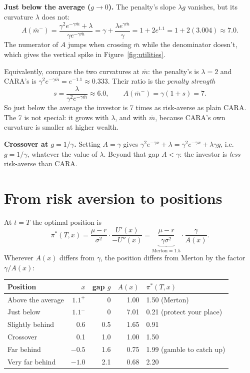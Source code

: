 \documentclass[11pt]{article}
\newcommand{\mb}{\bar m}
\begin{document}
\textbf{Just below the average ($g\to0$).} The penalty's slope $\lambda g$ vanishes, but its
curvature $\lambda$ does not:
\[
  A(\mb^-) = \frac{\gamma^2e^{-\gamma\mb}+\lambda}{\gamma e^{-\gamma\mb}}
           = \gamma + \frac{\lambda e^{\gamma\mb}}{\gamma}
           = 1 + 2e^{1.1} = 1 + 2(3.004) \approx 7.0 .
\]
The numerator of $A$ jumps when crossing $\mb$ while the denominator doesn't, which gives
the vertical spike in Figure~\ref{fig:utilities}.

Equivalently, compare the two curvatures at $\mb$: the penalty's is $\lambda=2$ and CARA's
is $\gamma^2e^{-\gamma\mb}=e^{-1.1}\approx0.333$. Their ratio is the
\emph{penalty strength}
\[
  s = \frac{\lambda}{\gamma^2e^{-\gamma\mb}} \approx 6.0,
  \qquad A(\mb^-) = \gamma(1+s) = 7 .
\]
So just below the average the investor is 7 times as risk-averse as plain CARA. The 7 is
not special: it grows with $\lambda$, and with $\mb$, because CARA's own curvature is
smaller at higher wealth.

\textbf{Crossover at $g=1/\gamma$.} Setting $A=\gamma$ gives
$\gamma^2e^{-\gamma x}+\lambda=\gamma^2e^{-\gamma x}+\lambda\gamma g$, i.e.\ $g=1/\gamma$,
whatever the value of $\lambda$. Beyond that gap $A<\gamma$: the investor is
\emph{less} risk-averse than CARA.

\section{From risk aversion to positions}

At $t=T$ the optimal position is
\[
  \pi^*(T,x) = \frac{\mu-r}{\sigma^2}\cdot\frac{U'(x)}{-U''(x)}
             = \underbrace{\frac{\mu-r}{\gamma\sigma^2}}_{\text{Merton}=1.5}\cdot\frac{\gamma}{A(x)} .
\]
Wherever $A(x)$ differs from $\gamma$, the position differs from Merton by the factor
$\gamma/A(x)$:

\begin{center}
\begin{tabular}{@{}lrrrl@{}}
\toprule
Position & $x$ & gap $g$ & $A(x)$ & $\pi^*(T,x)$ \\
\midrule
Above the average   & $1.1^+$ & 0    & 1.00 & 1.50 \quad (Merton) \\
Just below          & $1.1^-$ & 0    & 7.01 & 0.21 \quad (protect your place) \\
Slightly behind     & 0.6     & 0.5  & 1.65 & 0.91 \\
Crossover           & 0.1     & 1.0  & 1.00 & 1.50 \\
Far behind          & $-0.5$  & 1.6  & 0.75 & 1.99 \quad (gamble to catch up) \\
Very far behind     & $-1.0$  & 2.1  & 0.68 & 2.20 \\
\bottomrule
\end{tabular}
\end{center}
\end{document}
